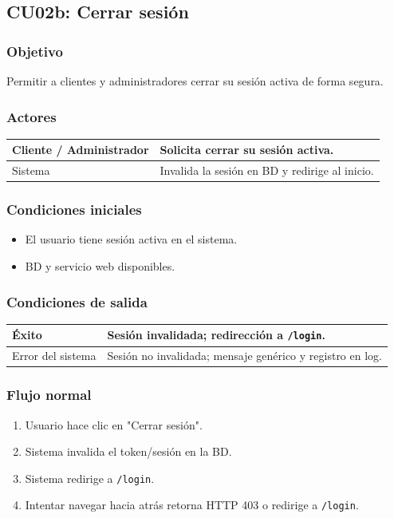 \documentclass[12pt,a4paper]{article}
\begin{document}

\subsection{CU02b: Cerrar sesión}
\subsubsection*{Objetivo}
Permitir a clientes y administradores cerrar su sesión activa de forma segura.

\subsubsection*{Actores}
\begin{longtable}{|l|p{10cm}|}
    \hline
    Cliente / Administrador & Solicita cerrar su sesión activa.              \\ \hline
    Sistema                 & Invalida la sesión en BD y redirige al inicio. \\ \hline
\end{longtable}

\subsubsection*{Condiciones iniciales}
\begin{itemize}[label=--]
    \item El usuario tiene sesión activa en el sistema.
    \item BD y servicio web disponibles.
\end{itemize}

\subsubsection*{Condiciones de salida}
\begin{longtable}{|l|p{10cm}|}
    \hline
    Éxito             & Sesión invalidada; redirección a \texttt{/login}.         \\ \hline
    Error del sistema & Sesión no invalidada; mensaje genérico y registro en log. \\ \hline
\end{longtable}

\subsubsection*{Flujo normal}
\begin{enumerate}[label=FN-\arabic*]
    \item Usuario hace clic en "Cerrar sesión".
    \item Sistema invalida el token/sesión en la BD.
    \item Sistema redirige a \texttt{/login}.
    \item Intentar navegar hacia atrás retorna HTTP 403 o redirige a \texttt{/login}.
\end{enumerate}
\end{document}
